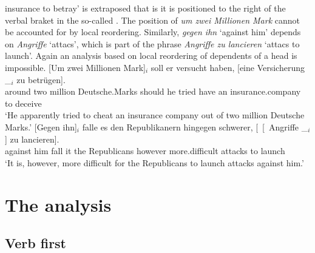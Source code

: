 insurance to betray' is extraposed that is it is positioned to the right of the verbal braket in the so-called \nf. The
position of \emph{um zwei Millionen Mark} cannot be accounted for by local reordering. Similarly,
\emph{gegen ihn} `against him' depends on \emph{Angriffe} `attacs', which is part of the phrase \emph{Angriffe zu
  lancieren} `attacs to launch'. Again an analysis based on local reordering of dependents of a head is impossible.
\eal
\label{bsp-Fernabhaengigkeit}
\ex\label{bsp-um-zwei-millionen}
\gll {}[Um zwei Millionen Mark]$_i$ soll er versucht haben, [eine Versicherung \_$_i$ zu betrügen].\footnotemark\\
       \spacebr{}around two million Deutsche.Marks should he tried have \spacebr{}an insurance.company {} to deceive\\
\glt `He apparently tried to cheat an insurance company out of two million Deutsche Marks.'
\ex
\gll {}[Gegen ihn]$_i$ falle es den Republikanern hingegen schwerer, [~[~Angriffe \_$_i$] zu lancieren].\footnotemark\\
	 {}\spacebr{}against him fall it the Republicans however more.difficult \hspaceThis{[~[~}attacks {} to launch\\
\glt `It is, however, more difficult for the Republicans to launch attacks against him.'
\zl



\section{The analysis}
\label{sec-analysis-verb-mevement}


\subsection{Verb first}

